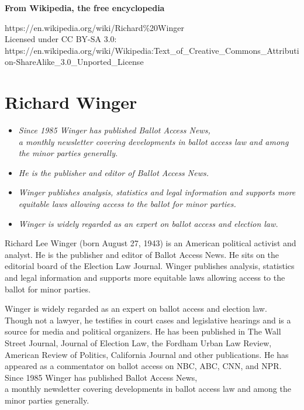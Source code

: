 \textbf{From Wikipedia, the free encyclopedia}

https://en.wikipedia.org/wiki/Richard\%20Winger\\
Licensed under CC BY-SA 3.0:\\
https://en.wikipedia.org/wiki/Wikipedia:Text\_of\_Creative\_Commons\_Attribution-ShareAlike\_3.0\_Unported\_License

\section{Richard Winger}\label{richard-winger}

\begin{itemize}
\item
  \emph{Since 1985 Winger has published Ballot Access News,\\
  a monthly newsletter covering developments in ballot access law and
  among the minor parties generally.}
\item
  \emph{He is the publisher and editor of Ballot Access News.}
\item
  \emph{Winger publishes analysis, statistics and legal information and
  supports more equitable laws allowing access to the ballot for minor
  parties.}
\item
  \emph{Winger is widely regarded as an expert on ballot access and
  election law.}
\end{itemize}

Richard Lee Winger (born August 27, 1943) is an American political
activist and analyst. He is the publisher and editor of Ballot Access
News. He sits on the editorial board of the Election Law Journal. Winger
publishes analysis, statistics and legal information and supports more
equitable laws allowing access to the ballot for minor parties.

Winger is widely regarded as an expert on ballot access and election
law.\\
Though not a lawyer, he testifies in court cases and legislative
hearings and is a source for media and political organizers. He has been
published in The Wall Street Journal, Journal of Election Law, the
Fordham Urban Law Review, American Review of Politics, California
Journal and other publications. He has appeared as a commentator on
ballot access on NBC, ABC, CNN, and NPR. Since 1985 Winger has published
Ballot Access News,\\
a monthly newsletter covering developments in ballot access law and
among the minor parties generally.

